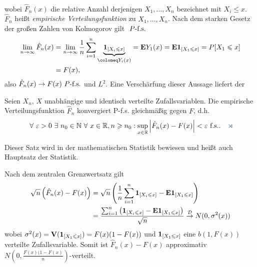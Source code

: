 \begin{bem}[Bemerkungen.]
\begin{bemenum}
\begin{align*}
\end{align*}
wobei $\hat{F}_n(x)$ die relative Anzahl derjenigen $X_1,\ldots,X_n$
bezeichnet mit $X_i\le x$. $\hat{F}_n$ heißt \emph{empirische
Verteilungsfunktion} zu $X_1,\ldots,X_n$. Nach dem starken Gesetz der großen
Zahlen von Kolmogorov gilt $\ P\text{-f.s.}$
\begin{align*}
\lim\limits_{n\to\infty}
\hat{F}_n(x)
&=
\lim\limits_{n\to\infty}
\frac{1}{n}\sum_{i=1}^n \underbrace{\Id_{[X_i\le x]}}_{\defl Y_i(x)}
= \E Y_1(x)
= \E \Id_{[X_1\le x]} = P[X_1\le x] \\ &= F(x),
\end{align*}
also $\hat{F}_n(x)\to F(x)\ P\text{-f.s.}$ und $L^2$. Eine Verschärfung dieser Aussage
liefert der
\begin{propn}
Seien $X_n$, $X$ unabhängige und identisch verteilte Zufallsvariablen. Die
empirische Verteilungsfunktion $\hat{F}_n$ konvergiert P-f.s. gleichmäßig
gegen $F$, d.h.
\begin{align*}
\forall \ep > 0\exists n_0\in\N \forall x\in \R,n\ge n_0:
\sup_{x\in\R}\abs{\hat{F}_n(x)-F(x)} < \ep\fs.\fishhere
\end{align*}
\end{propn}
Dieser Satz wird in der mathematischen Statistik bewiesen und heißt auch
Hauptsatz der Statistik.

Nach dem zentralen Grenzwertsatz gilt
\begin{align*}
\sqrt{n}\left(\hat{F}_n(x)-F(x) \right) &= \sqrt{n}
\left(\frac{1}{n}\sum_{i=1}^n \mathbf{1}_{[X_i\leqslant x]} - \textbf{E} \mathbf{1}_{[X_1\leqslant x]} \right)\\
&= 
\frac{\sum_{i=1}^n\left( \mathbf{1}_{[X_i\leqslant x]} - \textbf{E} \mathbf{1}_{[X_1\leqslant
x]}\right)}{\sqrt{n}} \overset{\mathcal{D}}{\to} N(0,\sigma^2(x))
\end{align*}
wobei $\sigma^2(x) = \textbf{V}(\mathbf{1}_{[X_1\leqslant x]}) = F(x)(1-F(x))$ und $\mathbf{1}_{[X_1\leqslant
x]}$ eine $b(1,F(x))$ verteilte Zufallsvariable.
Somit ist $\hat{F}_n(x)-F(x)$ approximativ
$N\left(0,\frac{F(x)(1-F(x)}{n}\right)$-verteilt.


\end{bemenum}
\end{bem}
